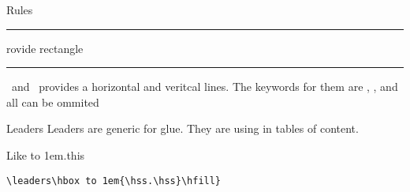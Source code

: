 \begin{frame}{Rules}

    \ccol\rule\ provide rectangle 
    \ccol\hrule\ and \ccol\vrule\ provides a horizontal and veritcal lines. The keywords for them are , ,  and all can be ommited 
\end{frame}

\begin{frame}[fragile]{Leaders}\relax
     Leaders are generic for glue. They are using in tables of content.
     
     Like \leaders\hbox to 1em{\hss.\hss}\hfill this
     
     \verb|\leaders\hbox to 1em{\hss.\hss}\hfill}|
\end{frame}
